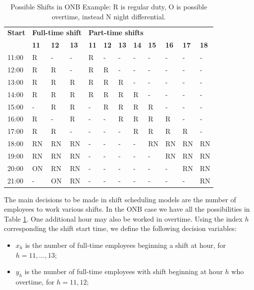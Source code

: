 \documentclass[a4paper,10 pt,titlepage,twoside]{report}
\theoremstyle{plain}
\theoremstyle{definition}
\theoremstyle{remark}
\begin{document}
{{\begin{table}[]\caption{\label{table:Shiftscheduling2}Possible Shifts in ONB Example: R is regular duty, O is possible overtime, instead N night differential.}
	\begin{center}
	\begin{tabular}{llllllllllll}
		\hline{\textbf{Start}} & \multicolumn{3}{l}{\textbf{Full-time shift}} & \multicolumn{8}{l}{\textbf{Part-time shifts}} \\ \cline{2-12} 
		& \textbf{11} & \textbf{12} & \textbf{13} & \textbf{11} & \textbf{12} & \textbf{13} & \textbf{14} & \textbf{15} & \textbf{16} & \textbf{17} & \textbf{18} \\ \hline
		11:00 & R & - & - & R & - & - & - & - & - & - & - \\
		12:00 & R & R & - & R & R & - & - & - & - & - & - \\
		13:00 & R & R & R & R & R & R & - & - & - & - & - \\
		14:00 & R & R & R & R & R & R & R & - & - & - & - \\
		15:00 & - & R & R & - & R & R & R & R & - & - & - \\
		16:00 & R & - & R & - & - & R & R & R & R & - & - \\
		17:00 & R & R & - & - & - & - & R & R & R & R & - \\
		18:00 & RN & RN & RN & - & - & - & - & RN & RN & RN & RN \\
		19:00 & RN & RN & RN & - & - & - & - & - & RN & RN & RN \\
		20:00 & ON & RN & RN & - & - & - & - & - & - & RN & RN \\
		21:00 & - & ON & RN & - & - & - & - & - & - & - & RN \\ \hline
	\end{tabular}
	\end{center}
\end{table}
The main decisions to be made in shift scheduling models are the number of employees to work various shifts. In the ONB case we have all the possibilities in Table \ref{table:Shiftscheduling2}. One additional hour may also be worked in overtime.
Using the index $h$ corresponding the shift start time, we define the following decision variables:
\begin{itemize}
	\item $x_{h}$ is the number of full-time employees beginning a shift at hour, for $h =11, \dots, 13$;
	\item $y_{h}$ is the number of full-time employees with shift beginning at hour $h$ who overtime, for $h=11, 12$;

\end{itemize}}}
\end{document}

